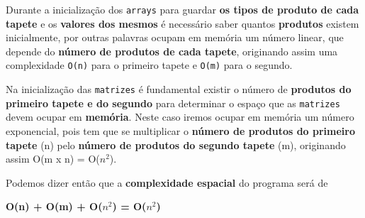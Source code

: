 \documentclass[11pt]{article}
\begin{document}
\hspace{0,5cm}Durante a inicialização dos \verb|arrays| para guardar \textbf{os tipos de produto de cada tapete} e os \textbf{valores dos mesmos }
é necessário saber quantos \textbf{produtos} existem inicialmente, por outras
palavras ocupam em memória um número linear, que depende do \textbf{número de produtos de cada tapete}, originando assim uma complexidade \verb|O(n)| para o primeiro tapete e \verb|O(m)| para o segundo.

Na inicialização das \verb|matrizes| é fundamental existir o número de \textbf{produtos do primeiro tapete e do segundo}
para determinar o espaço que as \verb|matrizes| devem ocupar em \textbf{memória}. Neste caso iremos ocupar em memória
um número exponencial, pois tem que se multiplicar o \textbf{número de produtos do primeiro tapete} (n) pelo \textbf{número de produtos do segundo tapete}
(m), originando assim O(m x n) = O($n^{2}$).

Podemos dizer então que a \textbf{complexidade espacial} do programa será de 
\begin{center}
    \textbf{O(n) + O(m) + O($n^{2}$) = O($n^{2}$)}
\end{center}

\end{document}
